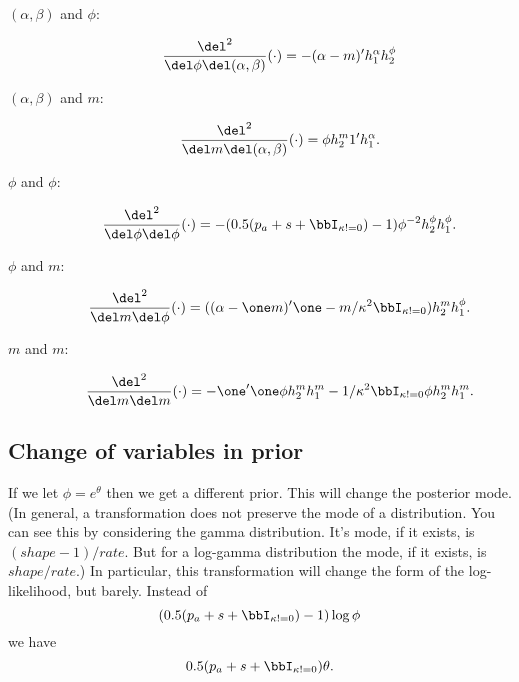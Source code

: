 \documentclass[draft]{article}
\newcommand{\hessdel}[2]{\frac{\del^2}{\del #1 \del #2}}
\begin{document}
\begin{description}
\item[$(\alpha,\beta)$ and $\phi$:]
\[
\hessdel{\phi}{(\alpha, \beta)} (\cdot) = -(\alpha-m)' h^{\alpha}_1 h^{\phi}_2
\]

\item[$(\alpha, \beta)$ and $m$:]
\[
\hessdel{m}{(\alpha, \beta)} (\cdot) = \phi h^{m}_2 1' h^{\alpha}_1.
\]

\item[$\phi$ and $\phi$:]
\[
\hessdel{\phi}{\phi} (\cdot) =  - (0.5 (p_a + s + \bbI_{\kappa != 0}) - 1) \phi^{-2}
h^{\phi}_2 h^{\phi}_1.
\]

\item[$\phi$ and $m$:]
\[
\hessdel{m}{\phi} (\cdot) = ( (\alpha - \one m)' \one - m / \kappa^2
\bbI_{\kappa != 0}) h^{m}_2 h^{\phi}_1.
\]

\item[$m$ and $m$:]
\[
\hessdel{m}{m} (\cdot) = -\one' \one \phi h^{m}_2 h^{m}_1 - 1/\kappa^2 \bbI_{\kappa !=
  0} \phi h^{m}_2 h^{m}_1.
\]

\end{description}

\subsection{Change of variables in prior}

If we let $\phi = e^\theta$ then we get a different prior.  This will change the
posterior mode.  (In general, a transformation does not preserve the mode of a
distribution.  You can see this by considering the gamma distribution.  It's
mode, if it exists, is $(shape - 1) / rate$.  But for a log-gamma distribution
the mode, if it exists, is $shape / rate$.)  In particular, this transformation
will change the form of the log-likelihood, but barely.  Instead of
\[
(0.5 (p_a + s + \bbI_{\kappa != 0}) - 1) \log \phi
\]
we have
\[
0.5 (p_a + s + \bbI_{\kappa != 0}) \theta.
\]

{}

\end{document}
